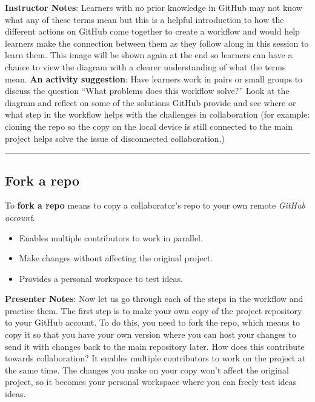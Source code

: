 \documentclass[
  letterpaper,
  DIV=11,
  numbers=noendperiod]{scrartcl}
\providecommand{\tightlist}{%
  \setlength{\itemsep}{0pt}\setlength{\parskip}{0pt}}
\begin{document}
\textbf{Instructor Notes}: Learners with no prior knowledge in GitHub
may not know what any of these terms mean but this is a helpful
introduction to how the different actions on GitHub come together to
create a workflow and would help learners make the connection between
them as they follow along in this session to learn them. This image will
be shown again at the end so learners can have a chance to view the
diagram with a clearer understanding of what the terms mean. \textbf{An
activity suggestion}: Have learners work in pairs or small groups to
discuss the question ``What problems does this workflow solve?'' Look at
the diagram and reflect on some of the solutions GitHub provide and see
where or what step in the workflow helps with the challenges in
collaboration (for example: cloning the repo so the copy on the local
device is still connected to the main project helps solve the issue of
disconnected collaboration.)

\begin{center}\rule{0.5\linewidth}{0.5pt}\end{center}

\subsection{Fork a repo}\label{fork-a-repo}

To \textbf{fork a repo} means to copy a collaborator's repo to your own
remote \emph{GitHub account}.

\begin{itemize}
\tightlist
\item
  Enables multiple contributors to work in parallel.
\item
  Make changes without affecting the original project.
\item
  Provides a personal workspace to test ideas.
\end{itemize}

\textbf{Presenter Notes}: Now let us go through each of the steps in the
workflow and practice them. The first step is to make your own copy of
the project repository to your GitHub account. To do this, you need to
fork the repo, which means to copy it so that you have your own version
where you can host your changes to send it with changes back to the main
repository later. How does this contribute towards collaboration? It
enables multiple contributors to work on the project at the same time.
The changes you make on your copy won't affect the original project, so
it becomes your personal workspace where you can freely test ideas
ideas.
\end{document}
